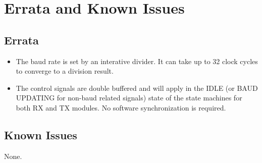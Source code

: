 \section{Errata and Known Issues}

\subsection{Errata}
\begin{itemize}
    \item The baud rate is set by an interative divider. It can take up to 32 clock cycles to converge to a division result.
    \item The control signals are double buffered and will apply in the IDLE (or BAUD UPDATING for non-baud related signals) state of the state machines
    for both RX and TX modules. No software synchronization is required.
\end{itemize}

\subsection{Known Issues}
None.